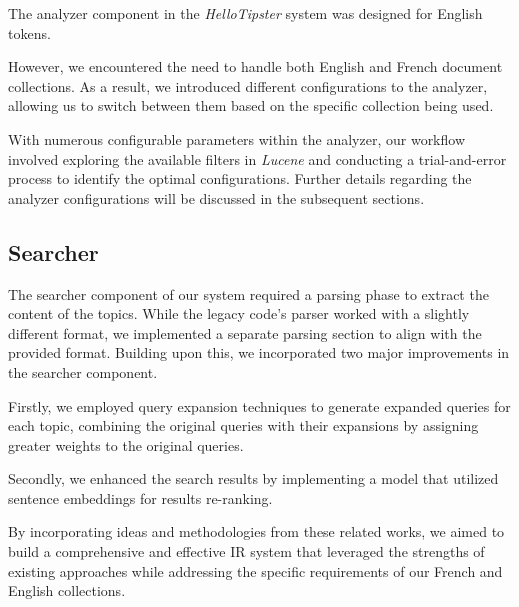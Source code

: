 The analyzer component in the \textit{HelloTipster} system was designed for English tokens.

However, we encountered the need to handle both English and French document collections. As a result, we introduced different configurations to the analyzer, allowing us to switch between them based on the specific collection being used. 

With numerous configurable parameters within the analyzer, our workflow involved exploring the available filters in \textit{Lucene} and conducting a trial-and-error process to identify the optimal configurations. Further details regarding the analyzer configurations will be discussed in the subsequent sections.

\subsection{Searcher}

The searcher component of our system required a parsing phase to extract the content of the topics. While the legacy code's parser worked with a slightly different format, we implemented a separate parsing section to align with the provided format. Building upon this, we incorporated two major improvements in the searcher component. 

Firstly, we employed query expansion techniques to generate expanded queries for each topic, combining the original queries with their expansions by assigning greater weights to the original queries. 

Secondly, we enhanced the search results by implementing a model that utilized sentence embeddings for results re-ranking.

By incorporating ideas and methodologies from these related works, we aimed to build a comprehensive and effective \ac{IR} system that leveraged the strengths of existing approaches while addressing the specific requirements of our French and English collections.